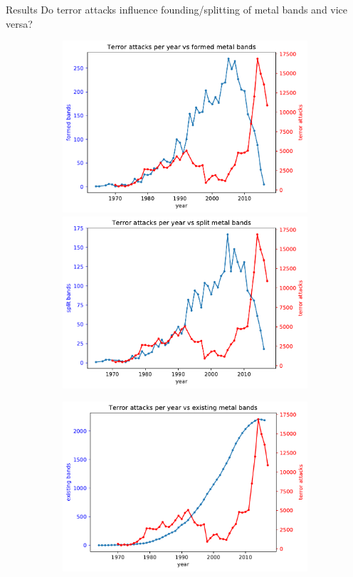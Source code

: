 \documentclass{beamer}
\begin{document}
\begin{frame}{Results}
	Do terror attacks influence founding/splitting of metal bands and vice versa?
	
	\begin{figure}
		\begin{subfigure}[b]{0.3\textwidth}
			\includegraphics[width=\textwidth]{Band-Terror/attacksVsBandsFormed}
			\includegraphics[width=\textwidth]{Band-Terror/attacksVsBandsSplit}
		\end{subfigure}
		\begin{subfigure}[b]{0.65\textwidth}
			\includegraphics[width=\textwidth]{Band-Terror/attacksVsBandsExisting}

\end{subfigure}
\end{figure}
\end{frame}
\end{document}
